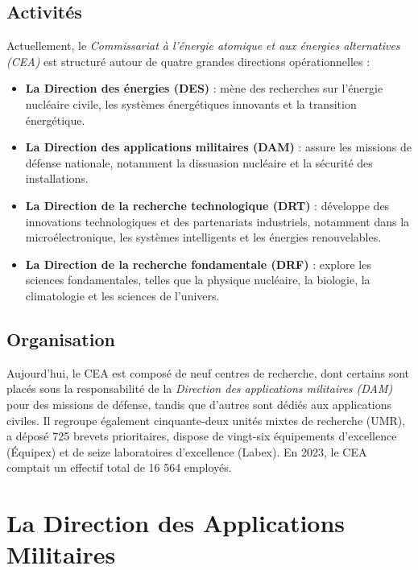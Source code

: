 \documentclass[12pt,a4paper]{report}
\begin{document}
\subsection{Activités}
Actuellement, le \textit{Commissariat à l'énergie atomique et aux énergies alternatives (CEA)} est structuré autour de quatre grandes directions opérationnelles :

\begin{itemize} \item \textbf{La Direction des énergies (DES)} : mène des recherches sur l’énergie nucléaire civile, les systèmes énergétiques innovants et la transition énergétique.

\item \textbf{La Direction des applications militaires (DAM)} : assure les missions de défense nationale, notamment la dissuasion nucléaire et la sécurité des installations.

\item \textbf{La Direction de la recherche technologique (DRT)} : développe des innovations technologiques et des partenariats industriels, notamment dans la microélectronique, les systèmes intelligents et les énergies renouvelables.

\item \textbf{La Direction de la recherche fondamentale (DRF)} : explore les sciences fondamentales, telles que la physique nucléaire, la biologie, la climatologie et les sciences de l’univers. \end{itemize}

\subsection{Organisation}
Aujourd'hui, le CEA est composé de neuf centres de recherche, dont certains sont placés sous la responsabilité de la \textit{Direction des applications militaires (DAM)} pour des missions de défense, tandis que d'autres sont dédiés aux applications civiles. Il regroupe également cinquante-deux unités mixtes de recherche (UMR), a déposé 725 brevets prioritaires, dispose de vingt-six équipements d’excellence (Équipex) et de seize laboratoires d’excellence (Labex). En 2023, le CEA comptait un effectif total de 16 564 employés.

\section{La Direction des Applications Militaires}
\end{document}

